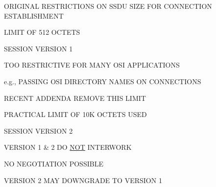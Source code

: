 \begin{bwslide}

\begin{nrtc}
\item	ORIGINAL RESTRICTIONS ON SSDU SIZE FOR CONNECTION ESTABLISHMENT
	\begin{nrtc}
	\item	LIMIT OF 512 OCTETS
	\item	SESSION VERSION 1
	\end{nrtc}
\item	TOO RESTRICTIVE FOR MANY OSI APPLICATIONS
	\begin{nrtc}
	\item	e.g., PASSING OSI DIRECTORY NAMES ON CONNECTIONS
	\end{nrtc}
\item	RECENT ADDENDA REMOVE THIS LIMIT
	\begin{nrtc}
	\item	PRACTICAL LIMIT OF 10K OCTETS USED
	\item	SESSION VERSION 2
	\end{nrtc}
\item	VERSION 1 \& 2 DO \underline{NOT} INTERWORK
	\begin{nrtc}
	\item	NO NEGOTIATION POSSIBLE
	\item	VERSION 2 MAY DOWNGRADE TO VERSION 1
	\end{nrtc}
\end{nrtc}
\end{bwslide}




%


%


